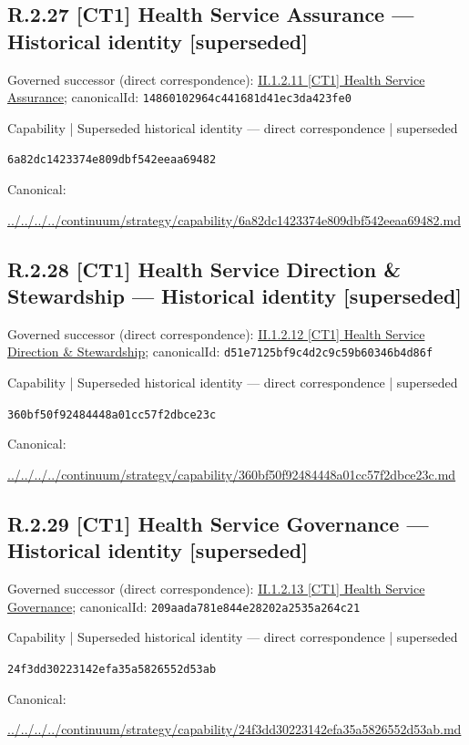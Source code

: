 \documentclass[10pt,a4paper]{article}
\begin{document}
\subsection*{R.2.27 [CT1] Health Service Assurance — Historical identity [superseded]}
Governed successor (direct correspondence): \hyperref[element-14860102964c441681d41ec3da423fe0]{II.1.2.11 [CT1] Health Service Assurance}; canonicalId: \texttt{14860102964c441681d41ec3da423fe0}\par
\label{element-6a82dc1423374e809dbf542eeaa69482}
{\small Capability | Superseded historical identity — direct correspondence | superseded}\par
\texttt{6a82dc1423374e809dbf542eeaa69482}\par
Canonical: \par
{\footnotesize\url{../../../../continuum/strategy/capability/6a82dc1423374e809dbf542eeaa69482.md}}\par
\subsection*{R.2.28 [CT1] Health Service Direction \& Stewardship — Historical identity [superseded]}
Governed successor (direct correspondence): \hyperref[element-d51e7125bf9c4d2c9c59b60346b4d86f]{II.1.2.12 [CT1] Health Service Direction \& Stewardship}; canonicalId: \texttt{d51e7125bf9c4d2c9c59b60346b4d86f}\par
\label{element-360bf50f92484448a01cc57f2dbce23c}
{\small Capability | Superseded historical identity — direct correspondence | superseded}\par
\texttt{360bf50f92484448a01cc57f2dbce23c}\par
Canonical: \par
{\footnotesize\url{../../../../continuum/strategy/capability/360bf50f92484448a01cc57f2dbce23c.md}}\par
\subsection*{R.2.29 [CT1] Health Service Governance — Historical identity [superseded]}
Governed successor (direct correspondence): \hyperref[element-209aada781e844e28202a2535a264c21]{II.1.2.13 [CT1] Health Service Governance}; canonicalId: \texttt{209aada781e844e28202a2535a264c21}\par
\label{element-24f3dd30223142efa35a5826552d53ab}
{\small Capability | Superseded historical identity — direct correspondence | superseded}\par
\texttt{24f3dd30223142efa35a5826552d53ab}\par
Canonical: \par
{\footnotesize\url{../../../../continuum/strategy/capability/24f3dd30223142efa35a5826552d53ab.md}}\par
\end{document}

